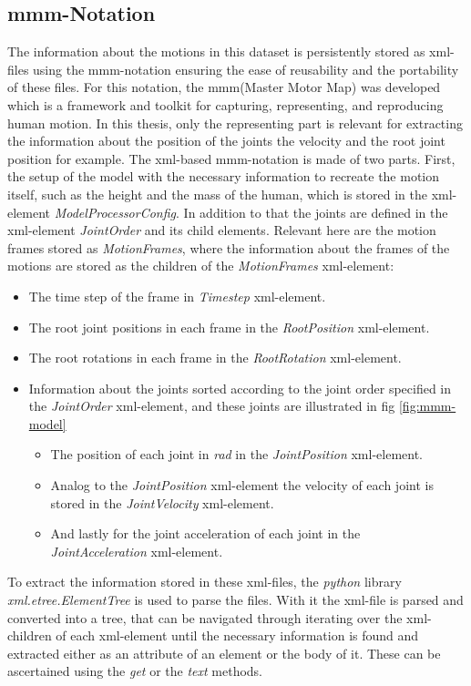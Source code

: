 		\subsection{mmm-Notation} \label{subsec:mmm-notation}
			The information about the motions in this dataset is persistently stored as xml-files using the mmm-notation ensuring the ease of reusability and the portability of these files. For this notation, the mmm(Master Motor Map) was developed which is a framework and toolkit for capturing, representing, and reproducing human motion. In this thesis, only the representing part is relevant for extracting the information about the position of the joints the velocity and the root joint position for example\cite{mmm2014}. The xml-based mmm-notation is made of two parts. First, the setup of the model with the necessary information to recreate the motion itself, such as the height and the mass of the human, which is stored in the xml-element \textit{ModelProcessorConfig}. In addition to that the joints are defined in the xml-element \textit{JointOrder} and its child elements. Relevant here are the motion frames stored as \textit{MotionFrames}, where the information about the frames of the motions are stored as the children of the \textit{MotionFrames} xml-element:
			\begin{itemize}
				\item The time step of the frame in \textit{Timestep} xml-element.
				\item The root joint positions in each frame in the \textit{RootPosition} xml-element.
				\item The root rotations in each frame in the \textit{RootRotation} xml-element.
				\item Information about the joints sorted according to the joint order specified in the \textit{JointOrder} xml-element, and these joints are illustrated in fig \ref{fig:mmm-model}
				\begin{itemize}
					\item The position of each joint in \textit{rad} in the \textit{JointPosition} xml-element.
					\item Analog to the \textit{JointPosition} xml-element the velocity of each joint is stored in the \textit{JointVelocity} xml-element.
					\item And lastly for the joint acceleration of each joint in the \\\textit{JointAcceleration} xml-element.
				\end{itemize}
			\end{itemize}
			To extract the information stored in these xml-files, the \textit{python} library \\\textit{xml.etree.ElementTree} is used to parse the files. With it the xml-file is parsed and converted into a tree, that can be navigated through iterating over the xml-children of each xml-element until the necessary information is found and extracted either as an attribute of an element or the body of it. These can be ascertained using the \textit{get} or the \textit{text} methods. 
